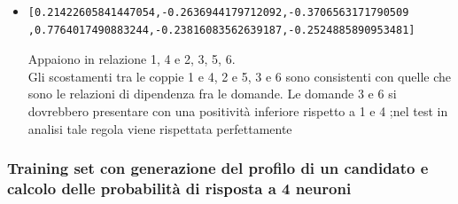 \documentclass[10pt,a4paper]{article}
\begin{document}
\begin{itemize}
\item \begin{verbatim}[0.21422605841447054,-0.2636944179712092,-0.3706563171790509
,0.7764017490883244,-0.23816083562639187,-0.2524885890953481]\end{verbatim}
Appaiono in relazione 1, 4 e 2, 3, 5, 6.\\
Gli scostamenti tra le coppie  1 e 4, 2 e 5, 3 e 6 sono consistenti con quelle che sono le relazioni di dipendenza fra le domande.
Le domande 3 e 6 si dovrebbero presentare con una positivit\`a inferiore rispetto a 1 e 4 ;nel test in analisi tale regola viene rispettata perfettamente

\end{itemize}


\subsubsection{Training set con generazione del profilo di un candidato e calcolo delle probabilit\`a di risposta a 4 neuroni}
\label{Training set con generazione del profilo di un candidato e calcolo delle probabilita di risposta a 4 neuroni}
\end{document}
